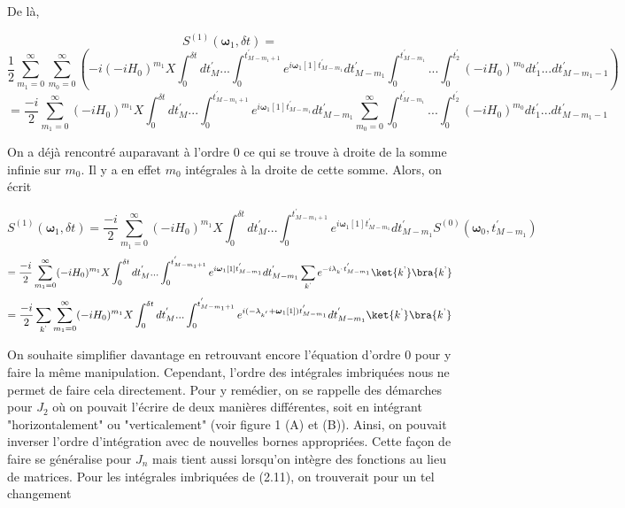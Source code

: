 De là,

\begin{equation*}
    S^{(1)}(\boldsymbol{\omega}_1, \delta t) = 
\end{equation*}
\begin{equation*}
    \frac{1}{2} \sum_{m_1 = 0}^{\infty}\sum_{m_0 = 0}^{\infty}\left(-i (-iH_0)^{m_1}X
    \int_{0}^{\delta t}dt_M^{'} ... \int_{0}^{t^{'}_{M-m_1+1}}e^{i\boldsymbol{\omega}_1[1]t^{'}_{M-m_1}} dt_{M-m_1}^{'}\int_{0}^{t^{'}_{M-m_1}}... \int_{0}^{t_2^{'}}(-iH_0)^{m_0} dt_1^{'} ... dt_{M - m_1 - 1}^{'}\right)
\end{equation*}
\begin{equation*}
    = \frac{-i}{2}\sum_{m_1 = 0}^{\infty}(-iH_0)^{m_1}X\int_{0}^{\delta t}dt^{'}_M ... \int_{0}^{t^{'}_{M-m_1+1}}e^{i\boldsymbol{\omega}_1[1]t^{'}_{M-m_1}} dt_{M-m_1}^{'}\sum_{m_0 = 0}^{\infty}\int_{0}^{t^{'}_{M-m_1}}... \int_{0}^{t_2^{'}}(-iH_0)^{m_0} dt_1^{'} ... dt_{M - m_1 - 1}^{'}
\end{equation*}

On a déjà rencontré auparavant à l'ordre 0 ce qui se trouve à droite de la somme infinie sur $m_0$. Il y a en effet $m_0$ intégrales à la droite de cette somme. Alors, on écrit

\begin{equation*}
    S^{(1)}(\boldsymbol{\omega}_1, \delta t) = \frac{-i}{2}\sum_{m_1 = 0}^{\infty}(-iH_0)^{m_1}X\int_{0}^{\delta t}dt^{'}_M ... \int_{0}^{t^{'}_{M-m_1+1}}e^{i\boldsymbol{\omega}_1[1]t^{'}_{M-m_1}} dt_{M-m_1}^{'}S^{(0)}(\boldsymbol{\omega}_0, t^{'}_{M-m_1})
\end{equation*}
\begin{equation*}
    = \frac{-i}{2}\sum_{m_1 = 0}^{\infty}(-iH_0)^{m_1}X\int_{0}^{\delta t}dt^{'}_M ... \int_{0}^{t^{'}_{M-m_1+1}}e^{i\boldsymbol{\omega}_1[1]t^{'}_{M-m_1}} dt_{M-m_1}^{'}\sum_{k^\text{'}}e^{-i\lambda_{k^\text{'}}t^{'}_{M-m_1}}\ket{k^\text{'}}\bra{k^\text{'}}
\end{equation*}
\begin{equation}
    = \frac{-i}{2}\sum_{k^\text{'}}\sum_{m_1 = 0}^{\infty}(-iH_0)^{m_1}X\int_{0}^{\delta t}dt^{'}_M ... \int_{0}^{t^{'}_{M-m_1+1}}e^{i(-\lambda_{k^{'}}+\boldsymbol{\omega}_1[1])t^{'}_{M-m_1}} dt_{M-m_1}^{'}\ket{k^\text{'}}\bra{k^\text{'}}
\end{equation}

On souhaite simplifier davantage en retrouvant encore l'équation d'ordre 0 pour y faire la même manipulation. Cependant, l'ordre des intégrales imbriquées nous ne permet de faire cela directement. Pour y remédier, on se rappelle des démarches pour $J_2$ où on pouvait l'écrire de deux manières différentes, soit en intégrant "horizontalement" ou "verticalement" (voir figure 1 (A) et (B)). Ainsi, on pouvait inverser l'ordre d'intégration avec de nouvelles bornes appropriées. Cette façon de faire se généralise pour $J_n$ mais tient aussi lorsqu'on intègre des fonctions au lieu de matrices. Pour les intégrales imbriquées de (2.11), on trouverait pour un tel changement

